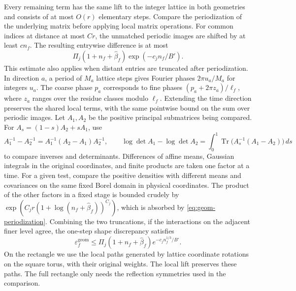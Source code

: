 \documentclass[11pt,a4paper]{article}
\numberwithin{equation}{section}
\newcommand{\Tr}{\operatorname{Tr}}
\begin{document}
Every remaining term has the same lift to the integer lattice in both geometries and consists of at most \(O(r)\) elementary steps. Compare the periodization of the underlying matrix before applying local matrix operations. For common indices at distance at most \(Cr\), the unmatched periodic images are shifted by at least \(cn_f\). The resulting entrywise difference is at most
\begin{equation}
 \Pi_j(1+n_f+\widehat\beta_f)\exp(-c_j n_f/B').
 \label{eq:geom-periodization}
\end{equation}
This estimate also applies when distant entries are truncated after periodization. In direction \(a\), a period of \(M_a\) lattice steps gives Fourier phases \(2\pi u_a/M_a\) for integers \(u_a\). The coarse phase \(p_a\) corresponds to fine phases \((p_a+2\pi z_a)/\ell_f\), where \(z_a\) ranges over the residue classes modulo \(\ell_f\). Extending the time direction preserves the shared local terms, with the same pointwise bound on the sum over periodic images. Let \(A_1,A_2\) be the positive principal submatrices being compared. For \(A_s=(1-s)A_2+sA_1\), use
\[
 A_1^{-1}-A_2^{-1}=A_1^{-1}(A_2-A_1)A_2^{-1},\qquad
 \log\det A_1-\log\det A_2=\int_0^1\Tr\big(A_s^{-1}(A_1-A_2)\big)\,ds
\]
to compare inverses and determinants. Differences of affine means, Gaussian integrals in the original coordinates, and finite products are taken one factor at a time. For a given test, compare the positive densities with different means and covariances on the same fixed Borel domain in physical coordinates. The product of the other factors in a fixed stage is bounded crudely by \(\exp(C_jr(1+\log(n_f+\widehat\beta_f))^{C_j})\), which is absorbed by \eqref{eq:geom-periodization}. Combining the two truncations, if the interactions on the adjacent finer level agree, the one-step shape discrepancy satisfies
\begin{equation}
 \varepsilon_f^{\mathrm{geom}}\le \Pi_j(1+n_f+\widehat\beta_f)e^{-c_jn_f^{1/3}/B'} .
 \label{eq:geom-seed}
\end{equation}
On the rectangle we use the local paths generated by lattice coordinate rotations on the square torus, with their original weights. The local lift preserves these paths. The full rectangle only needs the reflection symmetries used in the comparison.
\end{document}
